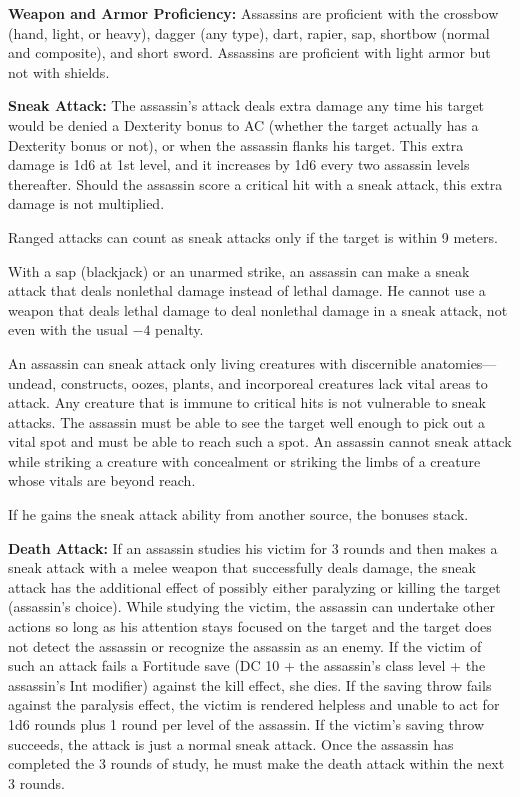 {
\textbf{Weapon and Armor Proficiency:} Assassins are proficient with the crossbow (hand, light, or heavy), dagger (any type), dart, rapier, sap, shortbow (normal and composite), and short sword. Assassins are proficient with light armor but not with shields.

\textbf{Sneak Attack:} The assassin's attack deals extra damage any time his target would be denied a Dexterity bonus to AC (whether the target actually has a Dexterity bonus or not), or when the assassin flanks his target. This extra damage is 1d6 at 1st level, and it increases by 1d6 every two assassin levels thereafter. Should the assassin score a critical hit with a sneak attack, this extra damage is not multiplied.

Ranged attacks can count as sneak attacks only if the target is within 9 meters.

With a sap (blackjack) or an unarmed strike, an assassin can make a sneak attack that deals nonlethal damage instead of lethal damage. He cannot use a weapon that deals lethal damage to deal nonlethal damage in a sneak attack, not even with the usual $-4$ penalty.

An assassin can sneak attack only living creatures with discernible anatomies---undead, constructs, oozes, plants, and incorporeal creatures lack vital areas to attack. Any creature that is immune to critical hits is not vulnerable to sneak attacks. The assassin must be able to see the target well enough to pick out a vital spot and must be able to reach such a spot. An assassin cannot sneak attack while striking a creature with concealment or striking the limbs of a creature whose vitals are beyond reach.

If he gains the sneak attack ability from another source, the bonuses stack.

\textbf{Death Attack:} If an assassin studies his victim for 3 rounds and then makes a sneak attack with a melee weapon that successfully deals damage, the sneak attack has the additional effect of possibly either paralyzing or killing the target (assassin's choice). While studying the victim, the assassin can undertake other actions so long as his attention stays focused on the target and the target does not detect the assassin or recognize the assassin as an enemy. If the victim of such an attack fails a Fortitude save (DC 10 + the assassin's class level + the assassin's Int modifier) against the kill effect, she dies. If the saving throw fails against the paralysis effect, the victim is rendered helpless and unable to act for 1d6 rounds plus 1 round per level of the assassin. If the victim's saving throw succeeds, the attack is just a normal sneak attack. Once the assassin has completed the 3 rounds of study, he must make the death attack within the next 3 rounds.

}
